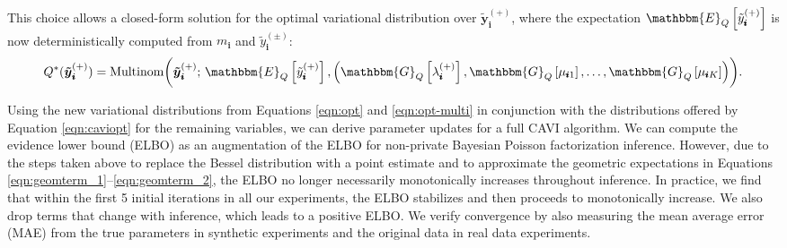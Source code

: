 \documentclass{article}
\newcommand{\subs}{\pmb{i}}
\newcommand{\wsup}[2]{#1_{\subs}^{(#2)}}
\newcommand{\ytP}{\wsup{\tilde{y}}{+}}
\newcommand{\ytPM}{\wsup{\tilde{y}}{\pm}}
\newcommand{\lamP}{\wsup{\lambda}{+}}
\newcommand{\ms}{m_{\subs}}
\newcommand{\yvtP}{\boldsymbol{\tilde{y}}_{\subs}^{(+)}}
\newcommand{\Eq}[1]{\mathbbm{E}_Q\left[#1\right]}
\newcommand{\Vq}[1]{\mathbbm{V}_Q\left[#1\right]}
\newcommand{\Gq}[1]{\mathbbm{G}_Q\left[#1\right]}
\begin{document}
  This choice allows a closed-form solution for the optimal variational
  distribution over $\yvtP$, where the expectation $\Eq{\ytP}$ is now
  deterministically computed from $\ms$ and $\ytPM$:
  \begin{equation}
  \label{eqn:opt-multi}
  Q^*(\yvtP) = \textup{Multinom} \biggl(\yvtP;\, \Eq{\ytP}, \left(\Gq{\lamP}, \Gq{\mu_{\subs 1}}, \dots, \Gq{\mu_{\subs K}} \right) \biggr).
  \end{equation}
  
  
  Using the new variational distributions from Equations \ref{eqn:opt} and
  \ref{eqn:opt-multi} in conjunction with the distributions offered by Equation
  \ref{eqn:caviopt} for the remaining variables, we can derive parameter updates
  for a full CAVI algorithm. We can compute the evidence lower bound (ELBO) as
  an augmentation of the ELBO for non-private Bayesian Poisson factorization
  inference. However, due to the steps taken above to replace the Bessel
  distribution with a point estimate and to approximate the geometric
  expectations in Equations \ref{eqn:geomterm_1}--\ref{eqn:geomterm_2}, the ELBO
  no longer necessarily monotonically increases throughout inference. In
  practice, we find that within the first 5 initial iterations in all our
  experiments, the ELBO stabilizes and then proceeds to monotonically increase.
  We also drop terms that change with inference, which leads
  to a positive ELBO. We verify convergence by also measuring the mean average
  error (MAE) from the true parameters in synthetic experiments and the original
  data in real data experiments.
  
\end{document}
